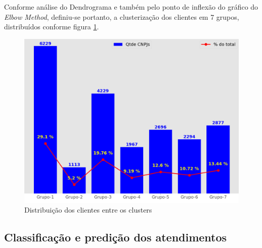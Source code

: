 \documentclass[twocolumn]{rbef}
\newcommand{\1}{\mathbbm{1}}
\begin{document}
\newline\linebreak Conforme análise do Dendrograma e também pelo ponto de inflexão do gráfico do \emph{Elbow Method}, definiu-se portanto, a clusterização dos clientes em 7 grupos, distribuídos conforme figura \ref{fig4}.
\begin{figure}[!htb]
  \includegraphics[scale=0.26]{4. Distribuição_CNPJs_clusters_7.png}
  \caption{Distribuição dos clientes entre os clusters}
  \label{fig4}
\end{figure}
\subsection{Classificação e predição dos atendimentos} \label{Sessao4.2}
\end{document}
